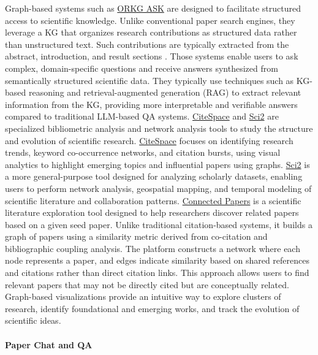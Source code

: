 Graph-based systems such as \href{https://ask.orkg.org}{ORKG ASK} are designed to facilitate structured access to scientific knowledge. Unlike conventional paper search engines, they leverage a KG that organizes research contributions as structured data rather than unstructured text. Such contributions are typically extracted from the abstract, introduction, and result sections \cite{dsouza-etal-2021-semeval, pramanick2024naturenlpanalyzingcontributions}. Those systems enable users to ask complex, domain-specific questions and receive answers synthesized from semantically structured scientific data. They typically use techniques such as KG-based reasoning and retrieval-augmented generation (RAG) to extract relevant information from the KG, providing more interpretable and verifiable answers compared to traditional LLM-based QA systems. \href{https://citespace.podia.com/}{CiteSpace} and \href{https://sci2.cns.iu.edu/user/index.php}{Sci2} are specialized bibliometric analysis and network analysis tools to study the structure and evolution of scientific research. \href{https://citespace.podia.com/}{CiteSpace} focuses on identifying research trends, keyword co-occurrence networks, and citation bursts, using visual analytics to highlight emerging topics and influential papers using graphs. \href{https://sci2.cns.iu.edu/user/index.php}{Sci2} is a more general-purpose tool designed for analyzing scholarly datasets, enabling users to perform network analysis, geospatial mapping, and temporal modeling of scientific literature and collaboration patterns. \href{https://www.connectedpapers.com/}{Connected Papers} is a scientific literature exploration tool designed to help researchers discover related papers based on a given seed paper. Unlike traditional citation-based systems, it builds a graph of papers using a similarity metric derived from co-citation and bibliographic coupling analysis. The platform constructs a network where each node represents a paper, and edges indicate similarity based on shared references and citations rather than direct citation links. This approach allows users to find relevant papers that may not be directly cited but are conceptually related. Graph-based visualizations provide an intuitive way to explore clusters of research, identify foundational and emerging works, and track the evolution of scientific ideas.

\paragraph{Paper Chat and QA}

